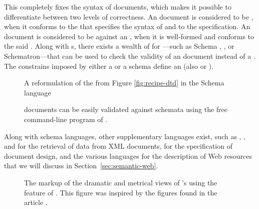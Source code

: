 This  completely fixes the syntax of  documents, which
makes it possible to differentiate between two levels of correctness. An
 document is considered to be %
, when it conforms to the  that
specifies the syntax of  and to the  specification.
An  document is considered to be
 against an , when it is
well-formed and conforms to the said . Along with s,
there exists a wealth of  for ---such as   Schema%
, , or Schematron---that can be used
to check the validity of an  document instead of a .
The constrains imposed by either a  or a schema define an
 (also  or ).
 

\begin{figure}
  \caption{A reformulation of the  from Figure \ref{fig:recipe-dtd}
    in the  Schema 
    language}
  \label{fig:recipe-xsd}
\end{figure}

\begin{figure}
  \caption{ documents can be easily validated against 
    schemata using the free command-line program of .}
\end{figure}

Along with schema languages, other supplementary languages exist, such as
, , and  for the retrieval of data from XML
documents,  for the specification of  document
design, and the various languages for the description of Web resources that we
will discuss in Section~\ref{sec:semantic-web}.

\begin{figure}[!b]
  \caption{The markup of the dramatic and metrical views of 's  using the  feature of
    . This figure was inspired by the figures found in the article
    \protect{}.}
\end{figure}

